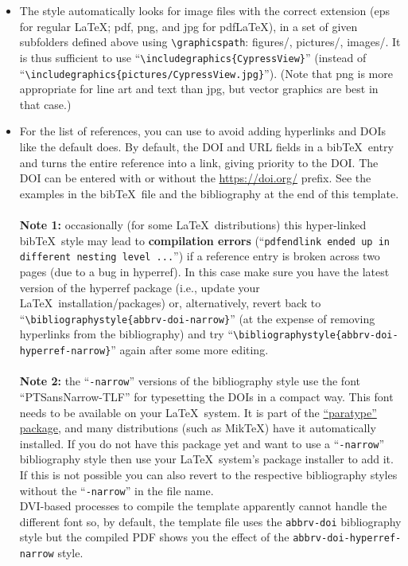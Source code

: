 \documentclass[journal]{vgtc}                %
\begin{document}
\begin{itemize}
	\item The style automatically looks for image files with the correct extension (eps for regular \LaTeX; pdf, png, and jpg for pdf\LaTeX), in a set of given subfolders defined above using \texttt{\textbackslash graphicspath}: figures/, pictures/, images/.
		It is thus sufficient to use ``\texttt{\textbackslash includegraphics\{CypressView\}}'' (instead of ``\texttt{\textbackslash includegraphics\{pictures/CypressView.jpg\}}'').
		(Note that png is more appropriate for line art and text than jpg, but vector graphics are best in that case.)
	
	\item For the list of references, you can use \verb|| to avoid adding hyperlinks and DOIs like the default \verb|| does.
		By default, the DOI and URL fields in a bib\TeX\ entry and turns the entire reference into a link, giving priority to the DOI.
		The DOI can be entered with or without the \url{https://doi.org/} prefix.
		See the examples in the bib\TeX\ file and the bibliography at the end of this template.\\\\
		\textbf{Note 1:} occasionally (for some \LaTeX\ distributions) this hyper-linked bib\TeX\ style may lead to \textbf{compilation errors} (``\texttt{pdfendlink ended up in different nesting level ...}'') if a reference entry is broken across two pages (due to a bug in hyperref).
		In this case make sure you have the latest version of the hyperref package (i.e., update your \LaTeX\ installation/packages) or, alternatively, revert back to ``\texttt{\textbackslash bibliographystyle\{abbrv-doi-narrow\}}'' (at the expense of removing hyperlinks from the bibliography) and try ``\texttt{\textbackslash bibliographystyle\{abbrv-doi-hyperref-narrow\}}'' again after some more editing.\\\\
		\textbf{Note 2:} the ``\texttt{-narrow}'' versions of the bibliography style use the font ``PTSansNarrow-TLF'' for typesetting the DOIs in a compact way.
		This font needs to be available on your \LaTeX\ system.
		It is part of the \href{https://www.ctan.org/pkg/paratype}{``paratype'' package}, and many distributions (such as MikTeX) have it automatically installed.
		If you do not have this package yet and want to use a ``\texttt{-narrow}'' bibliography style then use your \LaTeX\ system's package installer to add it.
		If this is not possible you can also revert to the respective bibliography styles without the ``\texttt{-narrow}'' in the file name.\\[1em]
		DVI-based processes to compile the template apparently cannot handle the different font so, by default, the template file uses the \texttt{abbrv-doi} bibliography style but the compiled PDF shows you the effect of the \texttt{abbrv-doi-hyperref-narrow} style.
\end{itemize}
\end{document}
